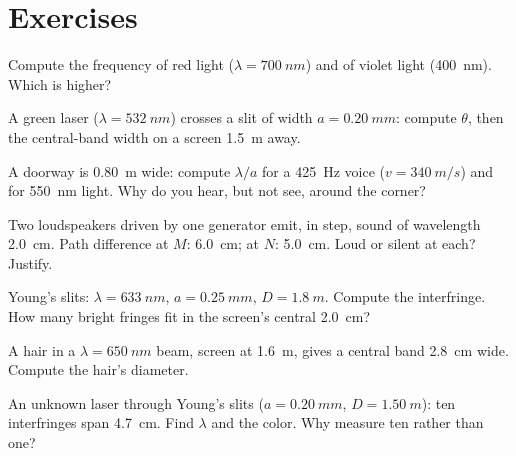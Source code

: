 \section{Exercises}

\begin{exercise}[$\star$]\label{exo:g12:light-as-wave:1}
Compute the frequency of red light ($\lambda = \qty{700}{nm}$) and of
violet light (\qty{400}{nm}). Which is higher?
\end{exercise}

\begin{exercise}[$\star$]\label{exo:g12:light-as-wave:2}
A green laser ($\lambda = \qty{532}{nm}$) crosses a slit of width
$a = \qty{0.20}{mm}$: compute $\theta$, then the central-band width
on a screen \qty{1.5}{m} away.
\end{exercise}

\begin{exercise}[$\star$]\label{exo:g12:light-as-wave:3}
A doorway is \qty{0.80}{m} wide: compute $\lambda/a$ for a
\qty{425}{Hz} voice ($v = \qty{340}{m/s}$) and for \qty{550}{nm}
light. Why do you hear, but not see, around the corner?
\end{exercise}

\begin{exercise}[$\star$]\label{exo:g12:light-as-wave:4}
Two loudspeakers driven by one generator emit, in step, sound of
wavelength \qty{2.0}{cm}. Path difference at $M$: \qty{6.0}{cm}; at
$N$: \qty{5.0}{cm}. Loud or silent at each? Justify.
\end{exercise}

\begin{exercise}[$\star$]\label{exo:g12:light-as-wave:5}
Young's slits: $\lambda = \qty{633}{nm}$, $a = \qty{0.25}{mm}$,
$D = \qty{1.8}{m}$. Compute the interfringe. How many bright fringes
fit in the screen's central \qty{2.0}{cm}?
\end{exercise}

\begin{exercise}[$\star\star$]\label{exo:g12:light-as-wave:6}
A hair in a $\lambda = \qty{650}{nm}$ beam, screen at \qty{1.6}{m},
gives a central band \qty{2.8}{cm} wide. Compute the hair's diameter.
\end{exercise}

\begin{exercise}[$\star\star$]\label{exo:g12:light-as-wave:7}
An unknown laser through Young's slits ($a = \qty{0.20}{mm}$,
$D = \qty{1.50}{m}$): ten interfringes span \qty{4.7}{cm}. Find
$\lambda$ and the color. Why measure ten rather than one?
\end{exercise}

